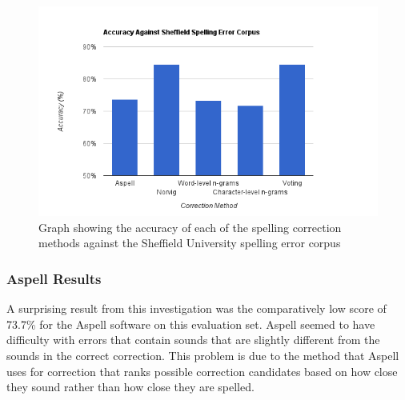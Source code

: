 \begin{figure}[!h]
	\centering
	\label{fig:errorchart}
	\includegraphics[scale=0.65]{images/sheffieldaccuracy}
	\caption{Graph showing the accuracy of each of the spelling correction methods against the Sheffield University spelling error corpus}
\end{figure}

\subsubsection{Aspell Results}
A surprising result from this investigation was the comparatively low score of 73.7\% for the Aspell software on this evaluation set. Aspell seemed to have difficulty with errors that contain sounds that are slightly different from the sounds in the correct correction. This problem is due to the method that Aspell uses for correction that ranks possible correction candidates based on how close they sound rather than how close they are spelled.

